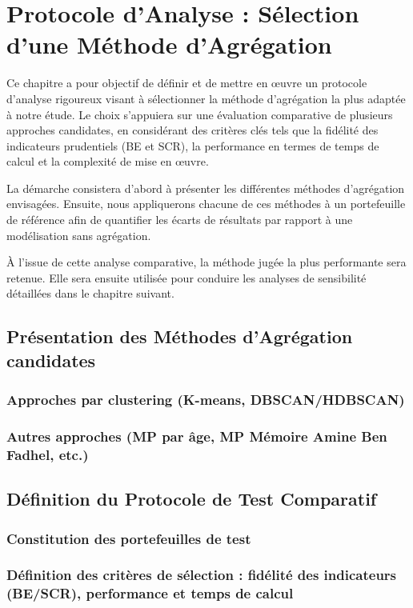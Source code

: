 \chapter{Protocole d'Analyse : Sélection d'une Méthode d'Agrégation}

Ce chapitre a pour objectif de définir et de mettre en œuvre un protocole d'analyse rigoureux visant à sélectionner la méthode d'agrégation la plus adaptée à notre étude. Le choix s'appuiera sur une évaluation comparative de plusieurs approches candidates, en considérant des critères clés tels que la fidélité des indicateurs prudentiels (BE et SCR), la performance en termes de temps de calcul et la complexité de mise en œuvre.

La démarche consistera d'abord à présenter les différentes méthodes d'agrégation envisagées. Ensuite, nous appliquerons chacune de ces méthodes à un portefeuille de référence afin de quantifier les écarts de résultats par rapport à une modélisation sans agrégation.

À l'issue de cette analyse comparative, la méthode jugée la plus performante sera retenue. Elle sera ensuite utilisée pour conduire les analyses de sensibilité détaillées dans le chapitre suivant.

\section{Présentation des Méthodes d'Agrégation candidates}
    \subsection{Approches par clustering (K-means, DBSCAN/HDBSCAN)}
    \subsection{Autres approches (MP par âge, MP Mémoire Amine Ben Fadhel, etc.)}

\section{Définition du Protocole de Test Comparatif}
    \subsection{Constitution des portefeuilles de test}
    \subsection{Définition des critères de sélection : fidélité des indicateurs (BE/SCR), performance et temps de calcul}

